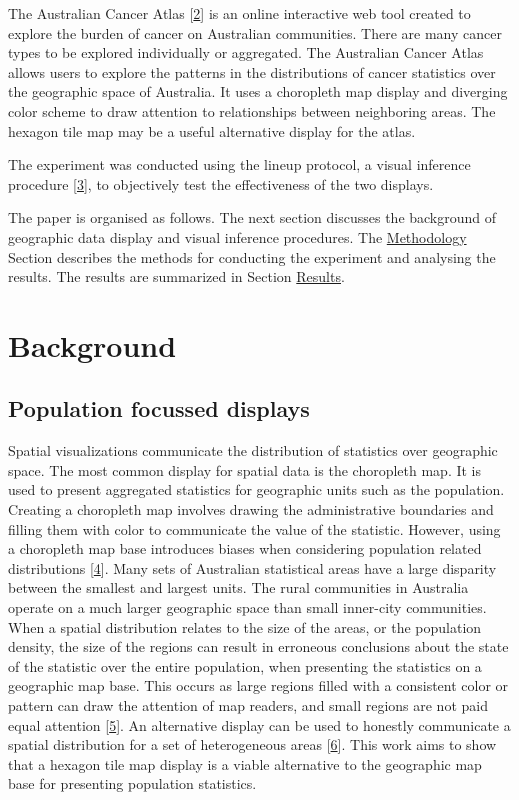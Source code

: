 \documentclass[conference,final,]{IEEEtran}
\begin{document}
The Australian Cancer Atlas {[}\protect\hyperlink{ref-atlas}{2}{]} is an online interactive web tool created to explore the burden of cancer on Australian communities. There are many cancer types to be explored individually or aggregated. The Australian Cancer Atlas allows users to explore the patterns in the distributions of cancer statistics over the geographic space of Australia. It uses a choropleth map display and diverging color scheme to draw attention to relationships between neighboring areas. The hexagon tile map may be a useful alternative display for the atlas.

The experiment was conducted using the lineup protocol, a visual inference procedure {[}\protect\hyperlink{ref-GIIV}{3}{]}, to objectively test the effectiveness of the two displays.

The paper is organised as follows. The next section discusses the background of geographic data display and visual inference procedures. The \protect\hyperlink{methodology}{Methodology} Section describes the methods for conducting the experiment and analysing the results. The results are summarized in Section \protect\hyperlink{results}{Results}.

\hypertarget{background}{%
\section{Background}\label{background}}

\hypertarget{population-focussed-displays}{%
\subsection{Population focussed displays}\label{population-focussed-displays}}

Spatial visualizations communicate the distribution of statistics over geographic space. The most common display for spatial data is the choropleth map. It is used to present aggregated statistics for geographic units such as the population. Creating a choropleth map involves drawing the administrative boundaries and filling them with color to communicate the value of the statistic. However, using a choropleth map base introduces biases when considering population related distributions {[}\protect\hyperlink{ref-CBATCC}{4}{]}.
Many sets of Australian statistical areas have a large disparity between the smallest and largest units.
The rural communities in Australia operate on a much larger geographic space than small inner-city communities. When a spatial distribution relates to the size of the areas, or the population density, the size of the regions can result in erroneous conclusions about the state of the statistic over the entire population, when presenting the statistics on a geographic map base. This occurs as large regions filled with a consistent color or pattern can draw the attention of map readers, and small regions are not paid equal attention {[}\protect\hyperlink{ref-CTTMB}{5}{]}. An alternative display can be used to honestly communicate a spatial distribution for a set of heterogeneous areas {[}\protect\hyperlink{ref-NISCC}{6}{]}.
This work aims to show that a hexagon tile map display is a viable alternative to the geographic map base for presenting population statistics.
\end{document}
